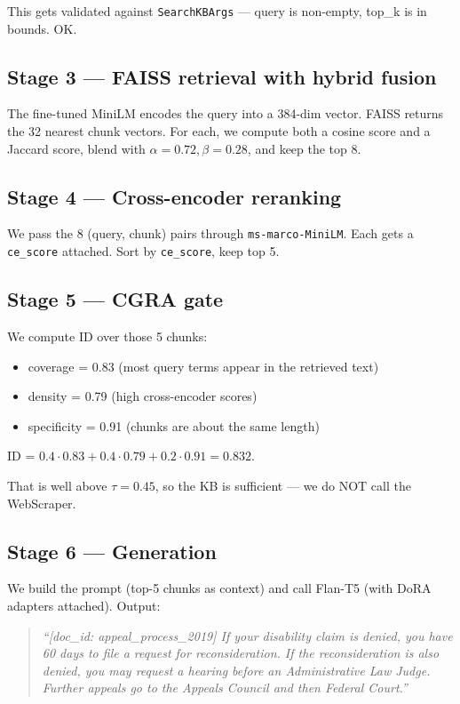\documentclass[11pt,a4paper]{article}
\begin{document}
This gets validated against \texttt{SearchKBArgs} --- query is non-empty, top\_k is in bounds. OK.

\subsection{Stage 3 --- FAISS retrieval with hybrid fusion}

The fine-tuned MiniLM encodes the query into a 384-dim vector. FAISS returns the 32 nearest chunk vectors. For each, we compute both a cosine score and a Jaccard score, blend with $\alpha=0.72, \beta=0.28$, and keep the top 8.

\subsection{Stage 4 --- Cross-encoder reranking}

We pass the 8 (query, chunk) pairs through \texttt{ms-marco-MiniLM}. Each gets a \texttt{ce\_score} attached. Sort by \texttt{ce\_score}, keep top 5.

\subsection{Stage 5 --- CGRA gate}

We compute ID over those 5 chunks:
\begin{itemize}[leftmargin=*, itemsep=1pt]
\item coverage = 0.83 (most query terms appear in the retrieved text)
\item density  = 0.79 (high cross-encoder scores)
\item specificity = 0.91 (chunks are about the same length)
\end{itemize}

ID = $0.4 \cdot 0.83 + 0.4 \cdot 0.79 + 0.2 \cdot 0.91 = 0.832$.

That is well above $\tau=0.45$, so the KB is sufficient --- we do NOT call the WebScraper.

\subsection{Stage 6 --- Generation}

We build the prompt (top-5 chunks as context) and call Flan-T5 (with DoRA adapters attached). Output:

\begin{quote}\small\itshape
``[doc\_id: appeal\_process\_2019] If your disability claim is denied, you have 60 days to file a request for reconsideration. If the reconsideration is also denied, you may request a hearing before an Administrative Law Judge. Further appeals go to the Appeals Council and then Federal Court.''
\end{quote}
\end{document}
